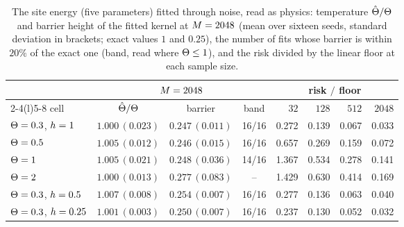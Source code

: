 \begin{table}[t]
\setlength{\tabcolsep}{5pt}
\centering
\small
\caption{The site energy (five parameters) fitted through noise, read as physics: temperature $\hat{\Theta}/\Theta$ and barrier height of the fitted kernel at $M=2048$ (mean over sixteen seeds, standard deviation in brackets; exact values $1$ and $0.25$), the number of fits whose barrier is within $20\%$ of the exact one (band, read where $\Theta\le1$), and the risk divided by the linear floor at each sample size.}
\label{tab:fieldpair}
\begin{tabular}{@{}lcccrrrr@{}}
\toprule
& \multicolumn{3}{c}{$M=2048$} & \multicolumn{4}{c}{risk $/$ floor} \\
\cmidrule(lr){2-4}\cmidrule(l){5-8}
cell & $\hat{\Theta}/\Theta$ & barrier & band & $32$ & $128$ & $512$ & $2048$ \\
\midrule
$\Theta=0.3$, $h=1$ & $1.000\,(0.023)$ & $0.247\,(0.011)$ & 16/16 & 0.272 & 0.139 & 0.067 & 0.033 \\
$\Theta=0.5$ & $1.005\,(0.012)$ & $0.246\,(0.015)$ & 16/16 & 0.657 & 0.269 & 0.159 & 0.072 \\
$\Theta=1$ & $1.005\,(0.021)$ & $0.248\,(0.036)$ & 14/16 & 1.367 & 0.534 & 0.278 & 0.141 \\
$\Theta=2$ & $1.000\,(0.013)$ & $0.277\,(0.083)$ & -- & 1.429 & 0.630 & 0.414 & 0.169 \\
$\Theta=0.3$, $h=0.5$ & $1.007\,(0.008)$ & $0.254\,(0.007)$ & 16/16 & 0.277 & 0.136 & 0.063 & 0.040 \\
$\Theta=0.3$, $h=0.25$ & $1.001\,(0.003)$ & $0.250\,(0.007)$ & 16/16 & 0.237 & 0.130 & 0.052 & 0.032 \\
\bottomrule
\end{tabular}
\end{table}

